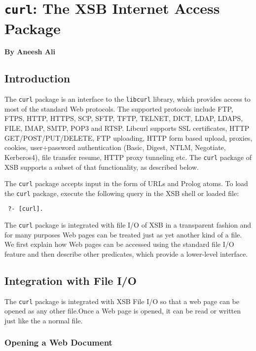 
\chapter{{\tt curl}: The XSB Internet Access Package}

\begin{center}
  {\Large {\bf By Aneesh Ali}}
\end{center}



\section{Introduction}

The {\tt curl} package is an interface to the {\tt libcurl}  library,
which provides access to most of the standard Web protocols.
The supported protocols include
FTP, FTPS, HTTP, HTTPS, SCP, SFTP, TFTP, TELNET, DICT, LDAP, LDAPS, FILE,
IMAP, SMTP, POP3 and RTSP. Libcurl supports SSL certificates, HTTP
GET/POST/PUT/DELETE, FTP uploading, HTTP form based upload, proxies,
cookies, user+password authentication (Basic, Digest, NTLM, Negotiate,
Kerberos4), file transfer resume, HTTP proxy tunneling etc. 
The \texttt{curl} package of XSB supports a subset of that functionality,
as described below. 


The {\tt curl} package accepts input in the form of URLs and Prolog
atoms. To load the {\tt curl} package, execute the following query in the
XSB shell or loaded file:
\begin{verbatim}
 ?- [curl].  
\end{verbatim}
The {\tt curl} package is integrated with file I/O of XSB in a transparent
fashion and for many purposes Web pages can be treated just as yet another
kind of a file. We first explain how Web pages can be accessed
using the standard file I/O feature and then describe other predicates,
which provide a lower-level interface.

\section{Integration with File I/O}

The {\tt curl} package is integrated with XSB File I/O so that a web page
can be opened as any other file.Once a Web page is opened, it can be read
or written just like the a normal file.


\subsection{Opening a Web Document}\label{sec-web-open}

